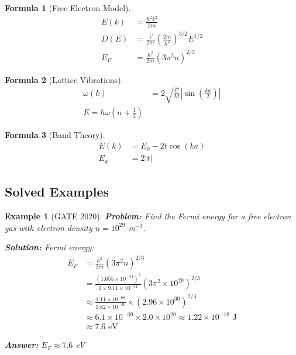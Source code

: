 \documentclass[12pt,a4paper]{article}
\newtheorem{example}{Example}[section]
\newtheorem{formula}{Formula}[section]
\newcommand{\ans}[1]{\textcolor{red!70!black}{\textbf{Answer:} #1}}
\newcommand{\sol}{\textcolor{blue!70!black}{\textbf{Solution:}}}
\begin{document}
\begin{formula}[Free Electron Model]
\begin{align}
E(k) &= \frac{\hbar^2 k^2}{2m}\\
D(E) &= \frac{V}{2\pi^2}\left(\frac{2m}{\hbar^2}\right)^{3/2} E^{1/2}\\
E_F &= \frac{\hbar^2}{2m}(3\pi^2 n)^{2/3}
\end{align}
\end{formula}

\begin{formula}[Lattice Vibrations]
\begin{align}
\omega(k) &= 2\sqrt{\frac{C}{M}}\left|\sin\left(\frac{ka}{2}\right)\right|\\
E = \hbar\omega\left(n + \frac{1}{2}\right)
\end{align}
\end{formula}

\begin{formula}[Band Theory]
\begin{align}
E(k) &= E_0 - 2t\cos(ka)\\
E_g &= 2|t|
\end{align}
\end{formula}

\subsection{Solved Examples}

\begin{example}[GATE 2020]
\textbf{Problem:} Find the Fermi energy for a free electron gas with electron density $n = 10^{29}$ m$^{-3}$.

\sol
Fermi energy:
\begin{align}
E_F &= \frac{\hbar^2}{2m}(3\pi^2 n)^{2/3}\\
&= \frac{(1.055 \times 10^{-34})^2}{2 \times 9.11 \times 10^{-31}} (3\pi^2 \times 10^{29})^{2/3}\\
&\approx \frac{1.11 \times 10^{-68}}{1.82 \times 10^{-30}} \times (2.96 \times 10^{30})^{2/3}\\
&\approx 6.1 \times 10^{-39} \times 2.0 \times 10^{20} \approx 1.22 \times 10^{-18} \text{ J}\\
&\approx 7.6 \text{ eV}
\end{align}

\ans{$E_F \approx 7.6$ eV}
\end{example}
\end{document}
